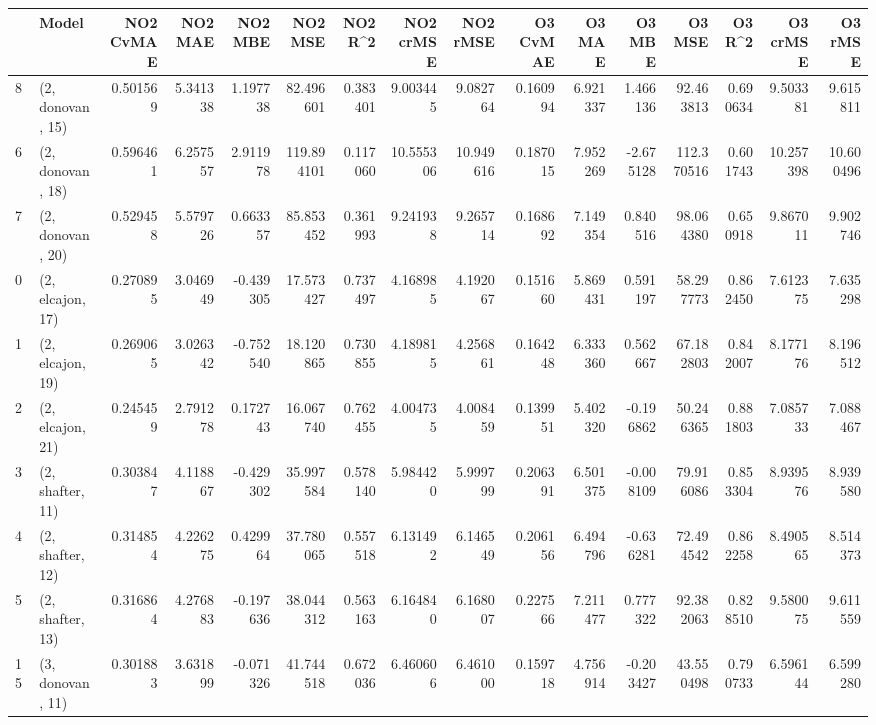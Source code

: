 \begin{tabular}{llrrrrrrrrrrrrrr}
\toprule
{} &             Model &  NO2 CvMAE &   NO2 MAE &   NO2 MBE &     NO2 MSE &   NO2 R\textasciicircum2 &  NO2 crMSE &   NO2 rMSE &  O3 CvMAE &    O3 MAE &    O3 MBE &      O3 MSE &    O3 R\textasciicircum2 &   O3 crMSE &    O3 rMSE \\
\midrule
8  &  (2, donovan, 15) &   0.501569 &  5.341338 &  1.197738 &   82.496601 &  0.383401 &   9.003445 &   9.082764 &  0.160994 &  6.921337 &  1.466136 &   92.463813 &  0.690634 &   9.503381 &   9.615811 \\
6  &  (2, donovan, 18) &   0.596461 &  6.257557 &  2.911978 &  119.894101 &  0.117060 &  10.555306 &  10.949616 &  0.187015 &  7.952269 & -2.675128 &  112.370516 &  0.601743 &  10.257398 &  10.600496 \\
7  &  (2, donovan, 20) &   0.529458 &  5.579726 &  0.663357 &   85.853452 &  0.361993 &   9.241938 &   9.265714 &  0.168692 &  7.149354 &  0.840516 &   98.064380 &  0.650918 &   9.867011 &   9.902746 \\
0  &  (2, elcajon, 17) &   0.270895 &  3.046949 & -0.439305 &   17.573427 &  0.737497 &   4.168985 &   4.192067 &  0.151660 &  5.869431 &  0.591197 &   58.297773 &  0.862450 &   7.612375 &   7.635298 \\
1  &  (2, elcajon, 19) &   0.269065 &  3.026342 & -0.752540 &   18.120865 &  0.730855 &   4.189815 &   4.256861 &  0.164248 &  6.333360 &  0.562667 &   67.182803 &  0.842007 &   8.177176 &   8.196512 \\
2  &  (2, elcajon, 21) &   0.245459 &  2.791278 &  0.172743 &   16.067740 &  0.762455 &   4.004735 &   4.008459 &  0.139951 &  5.402320 & -0.196862 &   50.246365 &  0.881803 &   7.085733 &   7.088467 \\
3  &  (2, shafter, 11) &   0.303847 &  4.118867 & -0.429302 &   35.997584 &  0.578140 &   5.984420 &   5.999799 &  0.206391 &  6.501375 & -0.008109 &   79.916086 &  0.853304 &   8.939576 &   8.939580 \\
4  &  (2, shafter, 12) &   0.314854 &  4.226275 &  0.429964 &   37.780065 &  0.557518 &   6.131492 &   6.146549 &  0.206156 &  6.494796 & -0.636281 &   72.494542 &  0.862258 &   8.490565 &   8.514373 \\
5  &  (2, shafter, 13) &   0.316864 &  4.276883 & -0.197636 &   38.044312 &  0.563163 &   6.164840 &   6.168007 &  0.227566 &  7.211477 &  0.777322 &   92.382063 &  0.828510 &   9.580075 &   9.611559 \\
15 &  (3, donovan, 11) &   0.301883 &  3.631899 & -0.071326 &   41.744518 &  0.672036 &   6.460606 &   6.461000 &  0.159718 &  4.756914 & -0.203427 &   43.550498 &  0.790733 &   6.596144 &   6.599280 \\

\end{tabular}
